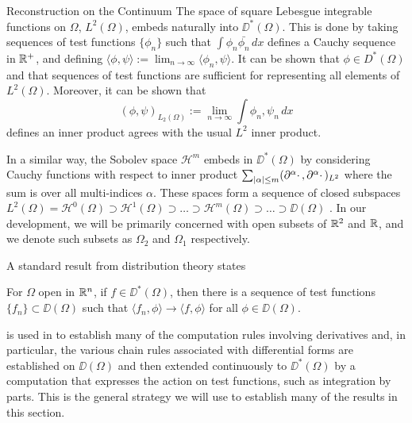 \begin{chapter}{Reconstruction on the Continuum}
The space of square Lebesgue integrable functions on $\Omega$, $L^2(\Omega)$, embeds naturally into $\DD^*(\Omega)$.
This is done by taking sequences of test functions $\{\phi_n\}$ such that $\int \phi_n \bar{\phi_n}\,dx$ defines a Cauchy sequence in $\mathbb R^+$, and defining $\langle \phi, \psi\rangle := \lim_{n\to\infty} \langle \phi_n,\psi\rangle$. It can be shown that $\phi \in D^*(\Omega)$ and that sequences of test functions are sufficient for representing all elements of $L^2(\Omega)$. Moreover, it can be shown that
\begin{equation} 
  (\phi,\psi)_{L_2(\Omega)} := \lim_{n\to\infty} \int \phi_n,\psi_n\,dx
\end{equation}
defines an inner product agrees with the usual $L^2$ inner product.

In a similar way, the Sobolev space $\mathscr H^m$ embeds in $\DD^*(\Omega)$ by considering Cauchy functions with respect to inner product $\sum_{|\alpha|\le m}(\partial^\alpha \cdot\,, \partial^\alpha \cdot \,)_{L^2}$ where the sum is over all multi-indices $\alpha$.
These spaces form a sequence of closed subspaces $L^2(\Omega) = \mathscr H^0(\Omega) \supset \mathscr H^1(\Omega) \supset \dots \supset \mathscr H^m(\Omega) \supset\dots \supset \DD(\Omega)$ \cite{hutson1980}.
In our development, we will be primarily concerned with open subsets of $\mathbb R^2$ and $\mathbb R$, and we denote such subsets as $\Omega_2$ and $\Omega_1$ respectively.

A standard result from distribution theory \cite[Theorem 4.1.5]{hormander1983} states 
\begin{thm} \label{thm:testFunDensity}
  For $\Omega$ open in $\mathbb R^n$, if $f \in \DD^*(\Omega)$, then there is a sequence of test functions $\{f_n\}\subset \DD(\Omega)$ such that $\langle f_n,\phi\rangle \to \langle f,\phi\rangle$ for all $\phi \in \DD(\Omega)$.
\end{thm}

 is used in \cite{hormander1983} to establish many of the computation rules involving derivatives and, in particular, the various chain rules associated with differential forms are established on $\DD(\Omega)$ and then extended continuously to $\DD^*(\Omega)$ by a computation that expresses the action on test functions, such as integration by parts. 
This is the general strategy we will use to establish many of the results in this section.


\end{chapter}
